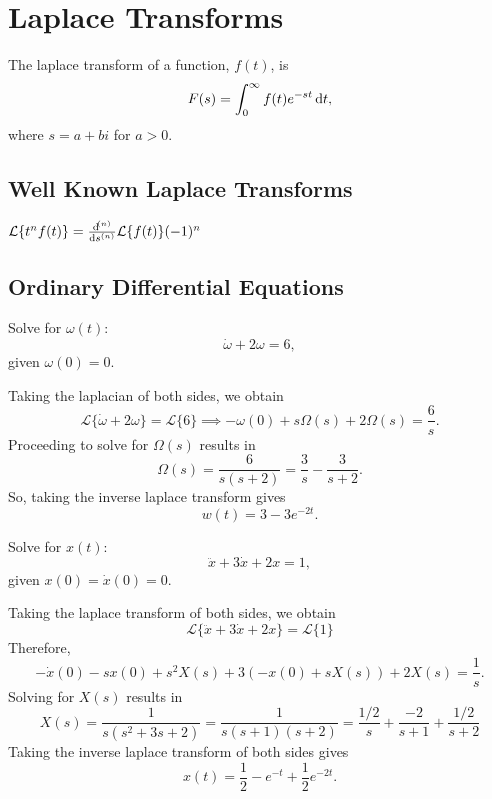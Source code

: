 \chapter{Laplace Transforms}

The \alert{laplace transform} of a function, $f(t)$, is 
$$F(s) = \int_0^{\infty} f(t)e^{-st} \dif t,$$ where $s = a + bi$ for $a > 0$.

\section{Well Known Laplace Transforms}

$\mathcal{L}\{t^nf(t)\} = \frac{\dif^{(n)}}{\dif s ^ {(n)}}\mathcal{L}\{f(t)\}(-1)^n$

\section{Ordinary Differential Equations}

\begin{example}
    Solve for $\omega(t)$: 
    $$\dot{\omega}+2\omega = 6,$$
    given $\omega(0) = 0$.
\end{example}
\begin{soln}
    Taking the laplacian of both sides, we obtain
    $$\mathcal{L} \{ \dot{\omega}+2\omega \} = \mathcal{L} \{6\}
    \implies -\omega(0) + s\Omega(s)+2\Omega(s) = \frac{6}{s}.$$
    Proceeding to solve for $\Omega(s)$ results in
    $$\Omega(s) = \frac{6}{s(s+2)} = \frac{3}{s} - \frac{3}{s+2}.$$
    So, taking the inverse laplace transform gives
    $$w(t) = 3-3e^{-2t}.$$
\end{soln}

\begin{example}
    Solve for $x(t)$:
    $$\ddot{x}+3\dot{x}+2x = 1,$$
    given $x(0) = \dot{x}(0) = 0$.
\end{example}
\begin{soln}
    Taking the laplace transform of both sides, we obtain
    $$\mathcal{L}\{\ddot{x}+3\dot{x}+2x\} = \mathcal{L}\{1\}$$
    Therefore, $$-\dot{x}(0)-sx(0)+s^2X(s)+3(-x(0)+sX(s))+2X(s)=\frac{1}{s}.$$
    Solving for $X(s)$ results in 
    $$X(s) = \frac{1}{s(s^2+3s+2)} = \frac{1}{s(s+1)(s+2)} = \frac{1/2}{s}+\frac{-2}{s+1}+\frac{1/2}{s+2}$$
    Taking the inverse laplace transform of both sides gives
    $$x(t) = \frac{1}{2}-e^{-t}+\frac{1}{2}e^{-2t}.$$
\end{soln}

